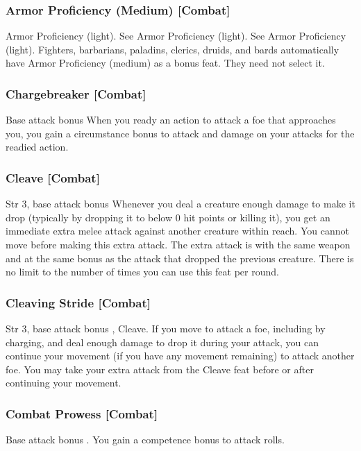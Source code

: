 \subsubsection{Armor Proficiency (Medium) [Combat]}
 Armor Proficiency (light).
 See Armor Proficiency (light).
 See Armor Proficiency (light).
 Fighters, barbarians, paladins, clerics, druids, and bards automatically have Armor Proficiency (medium) as a bonus feat. They need not select it.

\subsubsection{Chargebreaker [Combat]}
 Base attack bonus 
 When you ready an action to attack a foe that approaches you, you gain a  circumstance bonus to attack and damage on your attacks for the readied action.

\subsubsection{Cleave [Combat]}
 Str 3, base attack bonus 
 Whenever you deal a creature enough damage to make it drop (typically by dropping it to below 0 hit points or killing it), you get an immediate extra melee attack against another creature within reach. You cannot move before making this extra attack. The extra attack is with the same weapon and at the same bonus as the attack that dropped the previous creature. There is no limit to the number of times you can use this feat per round.

\subsubsection{Cleaving Stride [Combat]}
 Str 3, base attack bonus , Cleave.
 If you move to attack a foe, including by charging, and deal enough damage to drop it during your attack, you can continue your movement (if you have any movement remaining) to attack another foe. You may take your extra attack from the Cleave feat before or after continuing your movement.

\subsubsection{Combat Prowess [Combat]}
\featpre Base attack bonus .
\featben You gain a  competence bonus to attack rolls.

